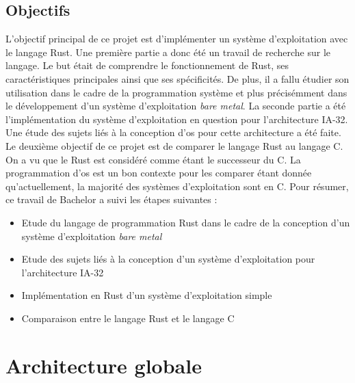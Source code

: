 \documentclass[a4paper, 12pt]{article}
\begin{document}
\subsection{Objectifs}
L'objectif principal de ce projet est d'implémenter un système d'exploitation
avec le langage Rust. Une première partie a donc été un travail de recherche
sur le langage. Le but était de comprendre le fonctionnement de Rust, ses caractéristiques
principales ainsi que ses spécificités. De plus, il a fallu étudier son utilisation
dans le cadre de la programmation système et plus précisémment dans le développement
d'un système d'exploitation \textit{bare metal}. La seconde partie a été l'implémentation
du système d'exploitation en question pour l'architecture \acrshort{IA-32}. Une étude
des sujets liés à la conception d'\acrshort{os} pour cette architecture a été faite.
Le deuxième objectif de ce projet est de comparer le langage Rust au langage C.
On a vu que le Rust est considéré comme étant le successeur du C. La programmation
d'\acrshort{os} est un bon contexte pour les comparer étant donnée qu'actuellement,
la majorité des systèmes d'exploitation sont en C. Pour résumer, ce travail de
Bachelor a suivi les étapes suivantes : \\

\begin{itemize}[label=\textbullet]
	\item Etude du langage de programmation Rust dans le cadre de la conception
    d'un système d'exploitation \textit{bare metal} 
	\item Etude des sujets liés à la conception d'un système d'exploitation pour
    l'architecture \acrshort{IA-32}
	\item Implémentation en Rust d'un système d'exploitation simple
    \item Comparaison entre le langage Rust et le langage C
\end{itemize}


\newpage
\section{Architecture globale}


\end{document}
